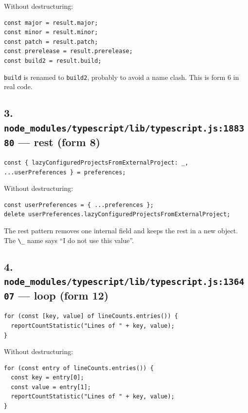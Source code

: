\documentclass[
  11pt,
]{article}
\begin{document}
Without destructuring:

\begin{lstlisting}
const major = result.major;
const minor = result.minor;
const patch = result.patch;
const prerelease = result.prerelease;
const build2 = result.build;
\end{lstlisting}

\texttt{build} is renamed to
\texttt{build2}, probably to avoid a name clash. This
is form 6 in real code.

\subsection{\texorpdfstring{3.
\texttt{node\_modules/typescript/lib/typescript.js:188380} --- rest
(form
8)}{3. node\_modules/typescript/lib/typescript.js:188380 --- rest (form 8)}}\label{node_modulestypescriptlibtypescript.js188380-rest-form-8}

\begin{lstlisting}
const { lazyConfiguredProjectsFromExternalProject: _, ...userPreferences } = preferences;
\end{lstlisting}

Without destructuring:

\begin{lstlisting}
const userPreferences = { ...preferences };
delete userPreferences.lazyConfiguredProjectsFromExternalProject;
\end{lstlisting}

The rest pattern removes one internal field and keeps the rest in a new
object. The \texttt{\textbackslash{}\_} name says ``I do not use this
value''.

\subsection{\texorpdfstring{4.
\texttt{node\_modules/typescript/lib/typescript.js:136407} --- loop
(form
12)}{4. node\_modules/typescript/lib/typescript.js:136407 --- loop (form 12)}}\label{node_modulestypescriptlibtypescript.js136407-loop-form-12}

\begin{lstlisting}
for (const [key, value] of lineCounts.entries()) {
  reportCountStatistic("Lines of " + key, value);
}
\end{lstlisting}

Without destructuring:

\begin{lstlisting}
for (const entry of lineCounts.entries()) {
  const key = entry[0];
  const value = entry[1];
  reportCountStatistic("Lines of " + key, value);
}
\end{lstlisting}
\end{document}
